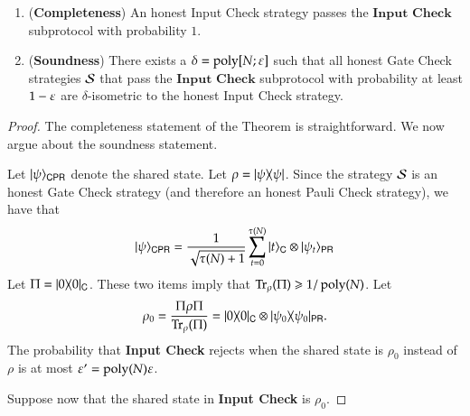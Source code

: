 \begin{lemma}	
\label{lem:input_check}
\leavevmode
\begin{enumerate}
	\item (\textbf{Completeness}) An honest Input Check strategy passes the $\textbf{Input Check}$ subprotocol with probability $1$. 
	\item (\textbf{Soundness}) There exists a $\delta = \operatorname{poly}[N;\varepsilon]$ such that all honest Gate Check strategies $\mathcal{S}$ that pass the $\textbf{Input Check}$ subprotocol with probability at least $1 - \varepsilon$ are $\delta$-isometric to the honest Input Check strategy.
\end{enumerate}
\end{lemma}
\begin{proof}
The completeness statement of the Theorem is straightforward. We now argue about the soundness statement.

Let $|\psi\rangle_{{\mathsf{C}} {\mathsf{P}} {\mathsf{R}}}$ denote the shared state. Let $\rho = |\psi\rangle\! \langle \psi|$. Since the strategy $\mathcal{S}$ is an honest Gate Check strategy (and therefore an honest Pauli Check strategy), we have that
\[
|\psi\rangle_{{\mathsf{C}}{\mathsf{P}} {\mathsf{R}}} = \frac{1}{\sqrt{\tau(N)+1}} \sum_{t = 0}^{\tau(N)} |t\rangle_{{\mathsf{C}}} \otimes |\psi_t\rangle_{{\mathsf{P}} {\mathsf{R}}}
\]
Let $\Pi = |0\rangle\! \langle 0|_{{\mathsf{C}}}$. These two items imply that $\operatorname{Tr}_\rho (\Pi) \geqslant 1/\operatorname{poly}(N)$. Let 
\[
	\rho_{0} = \frac{\Pi \rho \Pi}{\operatorname{Tr}_\rho (\Pi)} = |0\rangle\! \langle 0|_{{\mathsf{C}}} \otimes |\psi_0\rangle\! \langle \psi_0|_{{\mathsf{P}} {\mathsf{R}}}.
\]
The probability that \textbf{Input Check} rejects when the shared state is $\rho_{0}$ instead of $\rho$ is at most $\varepsilon' = \operatorname{poly}(N) \varepsilon$. 

Suppose now that the shared state in \textbf{Input Check} is $\rho_{0}$. 


\end{proof}
